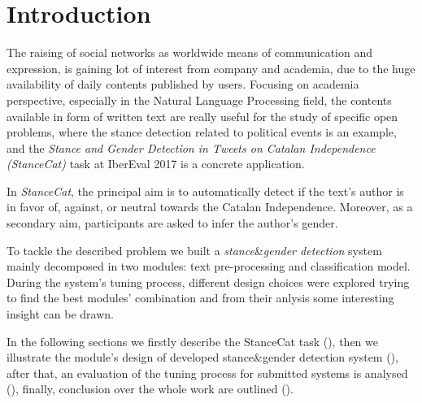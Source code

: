 \section{Introduction} \label{sec:introduction}

The raising of social networks as worldwide means of communication and expression, is gaining lot of interest from company and academia, due to the huge availability of daily contents published by users.
Focusing on academia perspective, especially in the Natural Language Processing field, the  contents available in form of written text are really useful for the study of specific open problems, where the stance detection related to political events is an example, and the \emph{Stance and Gender Detection in Tweets on Catalan Independence (StanceCat)} task at IberEval 2017 is a concrete application.

In \emph{StanceCat}, the principal aim is to automatically detect if the text's author is in favor of, against, or neutral towards the Catalan Independence. Moreover, as a secondary aim, participants are asked to infer the author's gender. 

To tackle the described problem we built a \emph{stance}\&\emph{gender detection} system mainly decomposed in two modules: text pre-processing and classification model.
During the system's tuning process, different design choices were explored trying to find the best modules' combination and from their anlysis some interesting insight can be drawn.

In the following sections we firstly describe the StanceCat task (), then we illustrate the module's design of developed stance\&gender detection system (), after that, an evaluation of the tuning process for submitted systems is analysed (), finally, conclusion over the whole work are outlined ().
